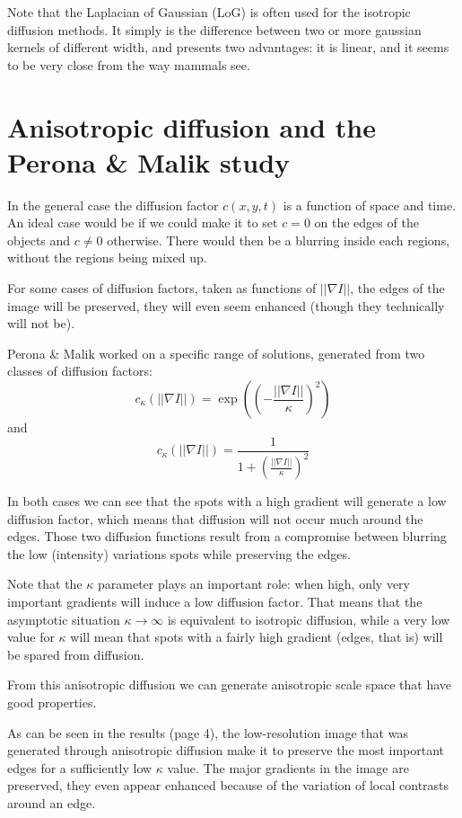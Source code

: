 \documentclass[12pt,a4paper]{article}
\begin{document}
Note that the Laplacian of Gaussian (LoG) is often used for the isotropic diffusion methods. It simply is the difference between two or more gaussian kernels of different width, and presents two advantages: it is linear, and it seems to be very close from the way mammals see.

\section{Anisotropic diffusion and the Perona \& Malik study}

In the general case the diffusion factor $c(x,y,t)$ is a function of space and time.
An ideal case would be if we could make it to set $c=0$ on the edges of the objects and $c \neq 0$ otherwise. There would then be a blurring inside each regions, without the regions being mixed up.

For some cases of diffusion factors, taken as functions of $|| \nabla I ||$, the edges of the image will be preserved, they will even seem enhanced (though they technically will not be).

Perona \& Malik worked on a specific range of solutions, generated from two classes of diffusion factors:
\begin{equation}
	c_{\kappa}(||\nabla I||) = \exp((-\frac{||\nabla I||}{\kappa})^{2})
\end{equation}
and
\begin{equation}
c_{\kappa}(||\nabla I||) = \frac{1}{1+(\frac{|| \nabla I ||}{\kappa})^{2}}
\end{equation}

In both cases we can see that the spots with a high gradient will generate a low diffusion factor, which means that diffusion will not occur much around the edges. Those two diffusion functions result from a compromise between blurring the low (intensity) variations spots while preserving the edges.

Note that the $\kappa$ parameter plays an important role: when high, only very important gradients will induce a low diffusion factor. That means that the asymptotic situation $\kappa \to \infty$ is equivalent to isotropic diffusion, while a very low value for $\kappa$ will mean that spots with a fairly high gradient (edges, that is) will be spared from diffusion.

From this anisotropic diffusion we can generate anisotropic scale space that have good properties.

As can be seen in the results (page 4), the low-resolution image that was generated through anisotropic diffusion make it to preserve the most important edges for a sufficiently low $\kappa$ value. The major gradients in the image are preserved, they even appear enhanced because of the variation of local contrasts around an edge.
\end{document}
